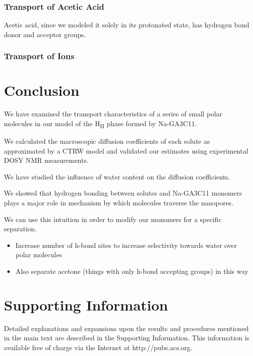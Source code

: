 \documentclass{article}
\begin{document}
  \subsubsection*{Transport of Acetic Acid}

  Acetic acid, since we modeled it solely in its protonated state, has hydrogen
  bond donor and acceptor groups. 

  \subsubsection*{Transport of Ions} %

   
  \section{Conclusion}

  We have examined the transport characteristics of a series of small polar
  molecules in our model of the H\textsubscript{II} phase formed by 
  Na-GA3C11.

  We calculated the macroscopic diffusion coefficients of each solute as 
  approximated by a CTRW model and validated our estimates using experimental
  DOSY NMR measurements.

  We have studied the influence of water content on the diffusion coefficients.

  We showed that hydrogen bonding between solutes and Na-GA3C11 monomers plays
  a major role in mechanism by which molecules traverse the nanopores. 

  We can use this intuition in order to modify our monomers for a specific 
  separation.
  \begin{itemize}
	\item Increase number of h-bond sites to increase selectivity towards water 
	over polar molecules
	\item Also separate acetone (things with only h-bond accepting groups) in this way
  \end{itemize}
  
 
  \section*{Supporting Information}

  Detailed explanations and expansions upon the results and procedures mentioned in
  the main text are described in the Supporting Information. This information is
  available free of charge via the Internet at http://pubs.acs.org.
\end{document}
